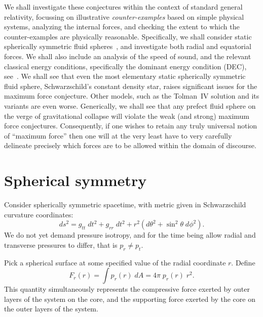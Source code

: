 \documentclass[12pt]{article}
\begin{document}
We shall investigate these conjectures within the context of standard general relativity, focussing on illustrative \emph{counter-examples} based on simple physical systems, analyzing the internal forces, and checking the extent to which the counter-examples are physically reasonable. 
%
Specifically, we shall consider static spherically symmetric fluid spheres~\cite{Delgaty, Rahman:2001, Martin:2003-a, Martin:2003-b, Boonserm:2005, Boonserm:2006-a, Boonserm:2006-b, Boonserm:2007-1, Boonserm:2007-2}, and investigate both radial and equatorial forces. We shall also include an analysis of the speed of sound, and the relevant classical energy conditions, specifically the dominant energy condition (DEC),
see~\cite{ECs, book, twilight, Visser:1997, Visser:1996, Cattoen:2006, LNP-survey, Martin-Moruno:2013-a, Martin-Moruno:2013-b, Martin-Moruno:2015}.
We shall see that even the most elementary static spherically symmetric fluid sphere, Schwarzschild's constant density star, raises significant issues for the maximum force conjecture.  Other models, such as the Tolman~IV solution and its variants are even worse.
Generically, we shall see that any prefect fluid sphere on the verge of gravitational collapse will violate the 
weak (and strong) maximum force conjectures.
Consequently, if one wishes to retain any truly universal notion of ``maximum force'' then one will at the very least have to very carefully delineate precisely which forces are to be allowed within the domain of discourse.

\enlargethispage{40pt}
\vspace{-15pt}
\section{Spherical symmetry}\label{C:SS}
\vspace{-10pt}
Consider spherically symmetric spacetime, with metric given in Schwarzschild curvature coordinates:
\begin{equation}
ds^2 = g_{tt} \; dt^2 + g_{rr} \; dt^2 + r^2 (d\theta^2 +\sin^2\theta\; d\phi^2).
\end{equation}
We do not yet demand pressure isotropy, and for the time being allow radial and transverse pressures to differ, that is $p_r \neq p_t$. 

Pick a spherical surface at some specified value of the radial coordinate $r$. Define
%
\begin{equation}
    F_r(r) = \int p_r(r) \; dA = 4\pi \;p_r(r) \; r^2.
    \label{eq:Radial Force}
\end{equation}
%
This quantity simultaneously represents the compressive force exerted by outer layers of the system on the core, and the supporting force exerted by the core on the outer layers of the system. 
\end{document}
